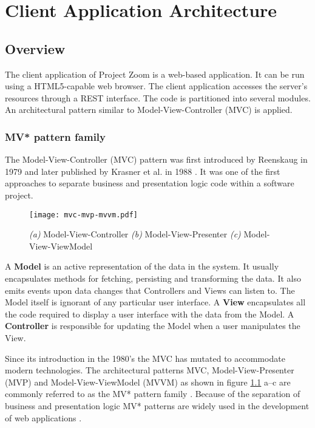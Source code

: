 \chapter{Client Application Architecture}

\section{Overview}
The client application of Project Zoom is a web-based application. It can be run using a HTML5-capable web browser. The client application accesses the server's resources through a REST interface. The code is partitioned into several modules. An architectural pattern similar to Model-View-Controller (MVC) is applied.

\subsection{MV* pattern family}
The Model-View-Controller (MVC) pattern was first introduced by Reenskaug in 1979 \cite{Reenskaug_1979} and later published by Krasner et al. in 1988 \cite{Krasner_1988}. It was one of the first approaches to separate business and presentation logic code within a software project.

\begin{figure}
\texttt{[image: mvc-mvp-mvvm.pdf]}
\caption[Diagrams of Model-View-Controller, Model-View-Presenter and Model-View-ViewModel]{\textit{(a)} Model-View-Controller \textit{(b)} Model-View-Presenter \textit{(c)} Model-View-ViewModel}
\label{fig:MV}
\end{figure}

A \textbf{Model} is an active representation of the data in the system. It usually encapsulates methods for fetching, persisting and transforming the data. It also emits events upon data changes that Controllers and Views can listen to. The Model itself is ignorant of any particular user interface. A \textbf{View} encapsulates all the code required to display a user interface with the data from the Model. A \textbf{Controller} is responsible for updating the Model when a user manipulates the View. \cite{Krasner_1988} \cite{Gamma_1994}

Since its introduction in the 1980's the MVC has mutated to accommodate modern technologies. The architectural patterns MVC, Model-View-Presenter (MVP) and Model-View-ViewModel (MVVM) as shown in figure \ref{fig:MV} a–c are commonly referred to as the MV* pattern family \cite{Osmani_2012}. Because of the separation of business and presentation logic MV* patterns are widely used in the development of web applications \cite{Takada_2012}.

